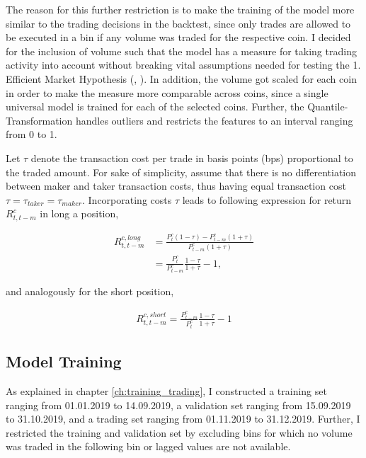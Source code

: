 The reason for this further restriction is to make the training of the model more similar to the 
trading decisions in the backtest, since only trades are allowed to be executed in a bin
if any volume was traded for the respective coin.
I decided for the inclusion of volume such that the model has a measure for 
taking trading activity into account without breaking vital assumptions needed for testing 
the 1. Efficient Market Hypothesis (\cite{malkiel2003marketHypothesis}, \cite{fama1970marketHypothesis}).
In addition, the volume got scaled for each coin in order to make the measure more comparable across coins,
since a single universal model is trained for each of the selected coins. 
Further, the Quantile-Transformation handles outliers and restricts the features to an interval ranging from 0 to 1.

Let $ \tau $ denote the transaction cost per trade in basis points (bps) proportional to the traded amount.
For sake of simplicity, assume that there is no differentiation between maker and taker transaction costs,
thus having equal transaction cost $ \tau = \tau_{taker} = \tau_{maker} $.
Incorporating costs $\tau$ leads to following expression for return $ R_{t, t-m}^{c} $ in long a position,

\begin{equation} \label{eq:return_transaction_cost_long}
    \begin{aligned}
        R_{t, t-m}^{c, long} &= \frac{ P_{t}^{c}(1 - \tau) - P_{t - m}^{c}(1 + \tau) }{ P_{t - m}^{c}(1 + \tau) }\\
        &= \frac{ P_{t}^{c} }{ P_{t - m}^{c} } \frac{ 1 - \tau }{ 1 + \tau } - 1,
    \end{aligned}
\end{equation}

and analogously for the short position,

\begin{equation} \label{eq:return_transaction_cost_short}
    \begin{aligned}
        R_{t, t-m}^{c, short} = \frac{ P_{t - m}^{c} }{ P_{t}^{c} } \frac{ 1 - \tau }{ 1 + \tau } - 1
    \end{aligned}
\end{equation}


\subsection{Model Training}
As explained in chapter \ref{ch:training_trading}, I constructed a training set ranging from 01.01.2019 to 14.09.2019, 
a validation set ranging from 15.09.2019 to 31.10.2019, and a trading set ranging from 01.11.2019 to 31.12.2019.
Further, I restricted the training and validation set by excluding bins for which no volume 
was traded in the following bin or lagged values are not available.

